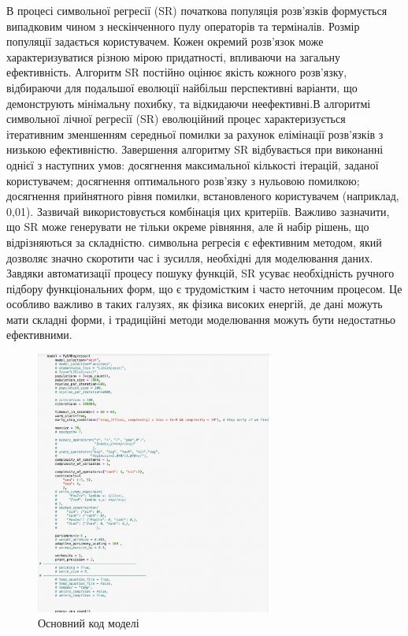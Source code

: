 \documentclass[14pt,a4paper,titlepage,oneside]{book}
\numberwithin{equation}{part}
\begin{document}
В процесі символьної регресії (SR) початкова популяція розв'язків формується випадковим чином з нескінченного пулу операторів та терміналів. Розмір популяції задається користувачем. Кожен окремий розв'язок може характеризуватися різною мірою придатності, впливаючи на загальну ефективність. Алгоритм SR постійно оцінює якість кожного розв'язку, відбираючи для подальшої еволюції найбільш перспективні варіанти, що демонструють мінімальну похибку, та відкидаючи неефективні.В алгоритмі символьної лічної регресії (SR) еволюційний процес характеризується ітеративним зменшенням середньої помилки за рахунок елімінації розв'язків з низькою ефективністю. Завершення алгоритму SR відбувається при виконанні однієї з наступних умов: досягнення максимальної кількості ітерацій, заданої користувачем; досягнення оптимального розв'язку з нульовою помилкою; досягнення прийнятного рівня помилки, встановленого користувачем (наприклад, 0,01). Зазвичай використовується комбінація цих критеріїв. Важливо зазначити, що SR може генерувати не тільки окреме рівняння, але й набір рішень, що відрізняються за складністю.
символьна регресія є ефективним методом, який дозволяє значно скоротити час і зусилля, необхідні для моделювання даних. Завдяки автоматизації процесу пошуку функцій, SR усуває необхідність ручного підбору функціональних форм, що є трудомістким і часто неточним процесом. Це особливо важливо в таких галузях, як фізика високих енергій, де дані можуть мати складні форми, і традиційні методи моделювання можуть бути недостатньо ефективними.
\begin{figure}[h]
    \centering
    \includegraphics[width=0.7\textwidth]{SR_Model.png} 
    \caption{Основний код моделі}
    \end{figure}
    
\end{document}
